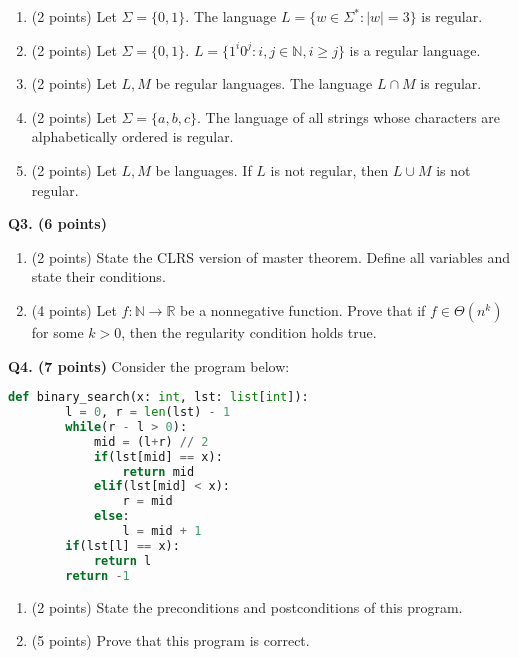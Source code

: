 \documentclass{article}
\begin{document}
    \begin{enumerate}[label=\alph*)]
        \item (2 points) Let \(\Sigma = \{0, 1\}\). The language \(L = \{w \in \Sigma ^* : |w| = 3\}\) is regular.
        \vfill
        \item (2 points) Let \(\Sigma = \{0, 1\}\). \(L = \{1^{i}0^j : i,j \in \mathbb{N}, i \geq j\}\) is a regular language.
        \vfill
        \item (2 points) Let \(L, M\) be regular languages. The language \(L \cap M\) is regular.
        \vfill
        \pagebreak
        \item (2 points) Let \(\Sigma = \{a, b, c\}\). The language of all strings whose characters are alphabetically ordered is regular.
        \vfill
        \item (2 points) Let \(L, M\) be languages. If \(L\) is not regular, then \(L \cup M\) is not regular.
        \vfill
    \end{enumerate}

    \pagebreak

    \noindent\textbf{Q3. (6 points)}
    \begin{enumerate}[label=\alph*)]
        \item (2 points) State the CLRS version of master theorem. Define all variables and state their conditions.
        \vfill
        \item (4 points) Let \(f: \mathbb{N} \to \mathbb{R}\) be a nonnegative function. Prove that if \(f \in \Theta (n^k)\) for some \(k > 0\), then the regularity condition holds true.
        \vfill
    \end{enumerate}

    \pagebreak

    \noindent\textbf{Q4. (7 points)} Consider the program below:
    \begin{lstlisting}[language=Python]
    def binary_search(x: int, lst: list[int]):
        l = 0, r = len(lst) - 1
        while(r - l > 0):
            mid = (l+r) // 2
            if(lst[mid] == x):
                return mid
            elif(lst[mid] < x):
                r = mid
            else:
                l = mid + 1
        if(lst[l] == x):
            return l
        return -1
    \end{lstlisting}
    \begin{enumerate}[label=\alph*)]
        \item (2 points) State the preconditions and postconditions of this program.
        \item (5 points) Prove that this program is correct.
    \end{enumerate}
    
\end{document}
